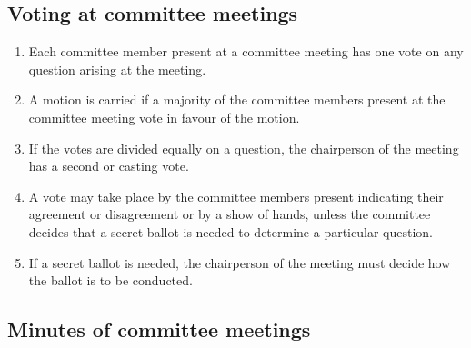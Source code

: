 \documentclass[../constitution.tex]{subfiles}
\begin{document}
\hypertarget{voting-at-committee-meetings}{%
  \subsection{Voting at committee meetings}\label{voting-at-committee-meetings}}

\begin{enumerate}

  \item Each committee member present at a committee meeting has one vote on any question arising at the meeting.
  \item A motion is carried if a majority of the committee members present at the committee meeting vote in favour of the motion.
  \item If the votes are divided equally on a question, the chairperson of the meeting has a second or casting vote.
  \item A vote may take place by the committee members present indicating their agreement or disagreement or by a show of hands, unless the committee decides that a secret ballot is needed to determine a particular question.
  \item If a secret ballot is needed, the chairperson of the meeting must decide how the ballot is to be conducted.
\end{enumerate}

\hypertarget{minutes-of-committee-meetings}{%
  \subsection{Minutes of committee meetings}\label{minutes-of-committee-meetings}}
\end{document}
